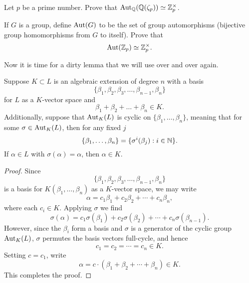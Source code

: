 \documentclass{ximera}
\begin{document}
\begin{exercise}
  Let $p$ be a prime number. Prove that $\operatorname{Aut}_\mathbb Q(\mathbb Q(\zeta_p))\simeq
  \mathbb Z_p^\times$.
\end{exercise}

\begin{exercise}
  If $G$ is a group, define $\operatorname{Aut}(G)$ to be the set of group
  automorphisms (bijective group homomorphisms from $G$ to
  itself). Prove that
  \[
  \operatorname{Aut}(\mathbb Z_p) \simeq \mathbb Z_p^\times.
  \]
\end{exercise}



Now it is time for a dirty lemma that we will use over and over again.


\begin{lemma}\label{L:fgf}
  Suppose $K\subset L$ is an algebraic extension of degree $n$
  with a basis
  \[
  \{\beta_1,\beta_2,\beta_3,\dots,\beta_{n-1},\beta_n\}
  \]
  for $L$ as a $K$-vector space and
  \[
  \beta_1 + \beta_2 + \dots + \beta_n \in K.
  \]
  Additionally, suppose that $\operatorname{Aut}_{K}(L)$ is cyclic on
  $\{\beta_1,\dots,\beta_n\}$, meaning that for some $\sigma\in
  \operatorname{Aut}_K(L)$, then for any fixed $j$
  \[
  \{\beta_1,\dots,\beta_n\} = \{\sigma^i(\beta_j):i\in \mathbb N\}.
  \]
  If $\alpha\in L$ with $\sigma(\alpha) = \alpha$, then $\alpha\in K$.
  \begin{proof}
    Since
    \[
    \{\beta_1,\beta_2,\beta_3,\dots,\beta_{n-1},\beta_n\}
    \]
    is a basis for $K(\beta_1,\dots,\beta_n)$ as a $K$-vector space, we may  write
    \[
    \alpha = c_1 \beta_1 + c_2 \beta_2 + \cdots + c_n\beta_{n},
    \]
    where each $c_i\in K$. Applying $\sigma$ we find
    \[
    \sigma(\alpha) = c_1 \sigma(\beta_1) + c_2 \sigma(\beta_2) + \cdots + c_n\sigma(\beta_{n-1}).
    \]
    However, since the $\beta_i$ form a basis and $\sigma$ is a
    generator of the cyclic group $\operatorname{Aut}_{K}(L)$, $\sigma$ permutes the
    basis vectors full-cycle, and hence
    \[
    c_1 = c_2 = \cdots = c_{n}\in K.
    \]
    Setting $c= c_1$, write
    \[
    \alpha = c \cdot (\beta_1 + \beta_2 + \cdots + \beta_{n}) \in K.
    \]
    This completes the proof.
  \end{proof}
\end{lemma}
\end{document}

